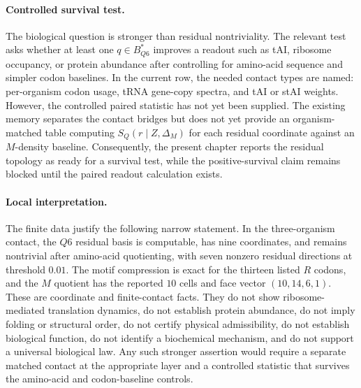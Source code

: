 \paragraph{Controlled survival test.}
The biological question is stronger than residual nontriviality. The relevant test asks whether at least one $q\in B^{*}_{Q6}$ improves a readout such as tAI, ribosome occupancy, or protein abundance after controlling for amino-acid sequence and simpler codon baselines. In the current row, the needed contact types are named: per-organism codon usage, tRNA gene-copy spectra, and tAI or stAI weights. However, the controlled paired statistic has not yet been supplied. The existing memory separates the contact bridges but does not yet provide an organism-matched table computing $S_Q(r\mid Z,\Delta_M)$ for each residual coordinate against an $M$-density baseline. Consequently, the present chapter reports the residual topology as ready for a survival test, while the positive-survival claim remains blocked until the paired readout calculation exists.

\paragraph{Local interpretation.}
The finite data justify the following narrow statement. In the three-organism contact, the $Q6$ residual basis is computable, has nine coordinates, and remains nontrivial after amino-acid quotienting, with seven nonzero residual directions at threshold $0.01$. The motif compression is exact for the thirteen listed $R$ codons, and the $M$ quotient has the reported $10$ cells and face vector $(10,14,6,1)$. These are coordinate and finite-contact facts. They do not show ribosome-mediated translation dynamics, do not establish protein abundance, do not imply folding or structural order, do not certify physical admissibility, do not establish biological function, do not identify a biochemical mechanism, and do not support a universal biological law. Any such stronger assertion would require a separate matched contact at the appropriate layer and a controlled statistic that survives the amino-acid and codon-baseline controls.